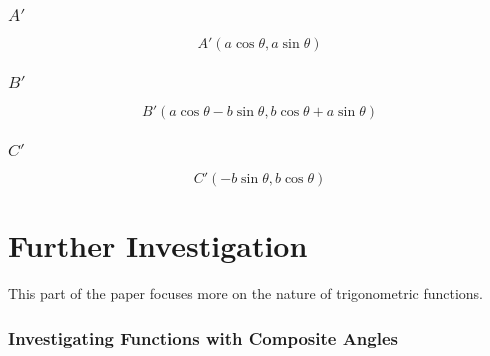 \documentclass{article}
\begin{document}
        \subsubsection{$A'$}
        \begin{equation}
            A'(a\cos{\theta}, a\sin{\theta})
        \end{equation}
        \subsubsection{$B'$}
        \begin{equation}
            B'(a\cos{\theta} -b\sin{\theta}, b\cos{\theta} + a\sin{\theta})
        \end{equation}
        \subsubsection{$C'$}
        \begin{equation}
            C'(-b\sin{\theta}, b\cos{\theta})
        \end{equation}
        \newpage
        \section{Further Investigation} This part of the paper focuses more on the nature of trigonometric functions.
        \subsubsection{Investigating Functions with Composite Angles}
\end{document}

